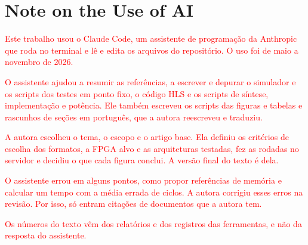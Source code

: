 \chapter{\texorpdfstring{Note on the Use of AI}{Note on the Use of AI}}\label{chap:nota-ia}

\textcolor{red}{Este trabalho usou o Claude Code, um assistente de programação da Anthropic que roda no terminal e lê e edita os arquivos do repositório. O uso foi de maio a novembro de 2026.}

\textcolor{red}{O assistente ajudou a resumir as referências, a escrever e depurar o simulador e os scripts dos testes em ponto fixo, o código HLS e os scripts de síntese, implementação e potência. Ele também escreveu os scripts das figuras e tabelas e rascunhos de seções em português, que a autora reescreveu e traduziu.}

\textcolor{red}{A autora escolheu o tema, o escopo e o artigo base. Ela definiu os critérios de escolha dos formatos, a FPGA alvo e as arquiteturas testadas, fez as rodadas no servidor e decidiu o que cada figura conclui. A versão final do texto é dela.}

\textcolor{red}{O assistente errou em alguns pontos, como propor referências de memória e calcular um tempo com a média errada de ciclos. A autora corrigiu esses erros na revisão. Por isso, só entram citações de documentos que a autora tem.}

\textcolor{red}{Os números do texto vêm dos relatórios e dos registros das ferramentas, e não da resposta do assistente.}
